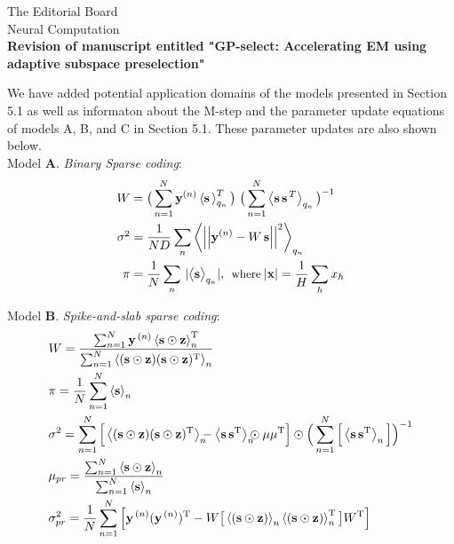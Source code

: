 \documentclass[10pt]{letter}
\newcommand{\disT}{\textstyle}
\newcommand{\disS}{\displaystyle}
\renewcommand{\vec}[1]{{\mathbf{#1}}}
\newcommand{\E}[1]{\left\langle{}#1\right\rangle} %
\newcommand{\sVec}{\vec{s}}
\newcommand{\zVec}{\vec{z}}
\newcommand{\yVecN}{\vec{y}^{\,(n)}}
\newcommand{\piVec}{\vec{\pi}}
\newcommand{\muVec}{\vec{\mu}}
\newcommand{\TT}{\mathrm{T}}
\newcommand{\ssb}{\hspace{-2mm}}
\begin{document}
\begin{letter}{
The Editorial Board\\
Neural Computation\\
\vspace{10mm}
\textbf{Revision of manuscript entitled "GP-select: Accelerating EM using adaptive
subspace preselection"}
}
\begin{enumerate}[topsep=3pt,itemsep=2ex,partopsep=1ex,parsep=1ex]
    We have added potential application domains of the models presented in Section 5.1 as well as
    informaton about the M-step and the parameter update equations of models A, B, and C in Section 5.1. These parameter updates are also shown below.\\

    Model \textbf{A}. \textit{Binary Sparse coding}:
    \begin{align}
\disT{}W &= \big( \sum_{n=1}^{N} \vec{y}^{(n)} \E{\vec{s}\,}^T_{q_n} \big)\ \big( \sum_{n=1}^{N} \left< \vec{s}\,\vec{s}^{\,T}\right>_{q_n}\big)^{-1}\, \nonumber\\
\disT{}\sigma^2 &= \frac{1}{ND} \sum_{n} \left< \left|\left| \vec{y}^{(n)} - W \, \vec{s} \right|\right|^2 \right>_{q_n}\hspace{-2mm}\nonumber\\
\pi &= \frac{1}{N} \sum_{n}\, |\big< \vec{s} \big>_{q_n}|,\:\:\mbox{\small where}\:|\vec{x}|=\frac{1}{H}\disS\sum_{h}x_h \nonumber
\end{align}

    Model \textbf{B}.  \textit{Spike-and-slab sparse coding}:
    \begin{align}
  &W = \frac{\sum_{n=1}^{N} \yVecN \E{\sVec\odot\zVec}^{\TT}_n}
  {\sum_{n=1}^{N} \E{(\sVec\odot\zVec)(\sVec\odot\zVec)^{\TT}}_n } \nonumber\\
%
&\piVec =
\frac{1}{N}\sum_{n=1}^{N}\E{\sVec}_n \nonumber\\
%
&\sigma^2 =
    \sum_{n=1}^{N} \Big[\E{(\sVec\odot\zVec)(\sVec\odot\zVec)^{\TT}}_n 
    \ssb -  \E{\sVec\,\sVec^{\TT}}_n \ssb \odot \muVec\muVec^{\TT} \Big] 
    \odot \Big(\sum_{n=1}^{N}\Big[\E{\sVec\,\sVec^{\TT}}_n \Big]\Big)^{-1} \nonumber\\
%
&\mu_{pr}  = \frac{\sum_{n=1}^{N} \E{\sVec\odot\zVec}_n}{\sum_{n=1}^{N}\E{\sVec}_n}  \nonumber\\
%
&\sigma^{2}_{pr} = \frac{1}{N}\sum_{n=1}^{N}\Big[ \yVecN(\yVecN)^{\TT}
        - W\big[\E{(\sVec\odot\zVec)}_n\E{(\sVec\odot\zVec)}_n^{\TT}\big]W^{\TT}\Big]  \nonumber
\end{align}



\end{enumerate}
\end{letter}
\end{document}
